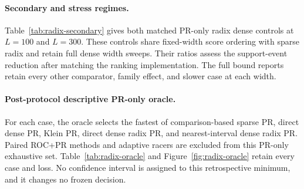 \paragraph{Secondary and stress regimes.}
Table~\ref{tab:radix-secondary} gives both matched PR-only radix dense controls at $L=100$ and $L=300$.
These controls share fixed-width score ordering with sparse radix and retain full dense width sweeps.
Their ratios assess the support-event reduction after matching the ranking implementation.
The full bound reports retain every other comparator, family effect, and slower case at each width.

\begin{table}[t]
\centering\small
\setlength{\tabcolsep}{3pt}
\caption{Secondary and stress widths: all 308 cases per row, matched PR-only controls. Ratio direction and intervals follow Table~\ref{tab:radix-primary}.}
\label{tab:radix-secondary}
\end{table}

\paragraph{Post-protocol descriptive PR-only oracle.}
For each case, the oracle selects the fastest of comparison-based sparse PR, direct dense PR,
Klein PR, direct dense radix PR, and nearest-interval dense radix PR.
Paired ROC+PR methods and adaptive racers are excluded from this PR-only exhaustive set.
Table~\ref{tab:radix-oracle} and Figure~\ref{fig:radix-oracle} retain every case and loss.
No confidence interval is assigned to this retrospective minimum, and it changes no frozen decision.

